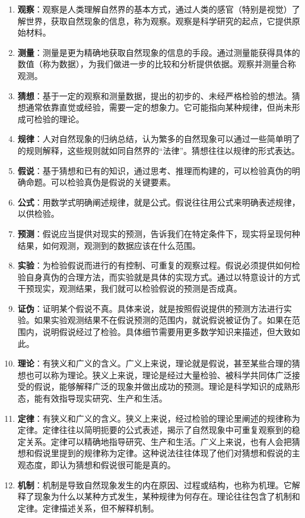 \documentclass[12pt,UTF8,fontset=none]{ctexbook}
\begin{document}
\begin{enumerate}[label=\textbf{\arabic*.}]
    \item \textbf{观察}：观察是人类理解自然界的基本方式，通过人类的感官（特别是视觉）了解世界，获取自然现象的信息，称为观察。观察是科学研究的起点，它提供原始材料。
    \item \textbf{测量}：测量是更为精确地获取自然现象的信息的手段。通过测量能获得具体的数值（称为数据），为我们做进一步的比较和分析提供依据。观察并测量合称观测。
    \item \textbf{猜想}：基于一定的观察和测量数据，提出的初步的、未经严格检验的想法。猜想通常依靠直觉或经验，需要一定的想象力。它可能指向某种规律，但尚未形成可检验的理论。
    \item \textbf{规律}：人对自然现象的归纳总结，认为繁多的自然现象可以通过一些简单明了的规则解释，这些规则就如同自然界的“法律”。猜想往往以规律的形式表达。
    \item \textbf{假说}：基于猜想和已有的知识，通过思考、推理而构建的，可以检验真伪的明确命题。可以检验真伪是假说的关键要素。
    \item \textbf{公式}：用数学式明确阐述规律，就是公式。假说往往用公式来明确表述规律，以供检验。
    \item \textbf{预测}：假说应当提供对现实的预测，告诉我们在特定条件下，现实将呈现何种结果，如何观测，观测到的数据应该在什么范围。
    \item \textbf{实验}：为检验假说而进行的有控制、可重复的观察过程。假说必须提供如何检验自身真伪的合理方法，而实验就是具体的实现方式。通过以特意设计的方式干预现实，观测结果，我们就可以检验假说的预测是否成真。
    \item \textbf{证伪}：证明某个假说不真。具体来说，就是按照假说提供的预测方法进行实验。如果实验观测结果不在假说预测的范围内，就说假说被证伪了。如果在范围内，说明假说经过了检验。具体细节需要用更多数学知识来描述，但大致如此。
    \item \textbf{理论}：有狭义和广义的含义。广义上来说，理论就是假说，甚至某些合理的猜想也可以称为理论。狭义上来说，理论是经过大量检验、被科学共同体广泛接受的假说，能够解释广泛的现象并做出成功的预测。理论是科学知识的成熟形态，能有效指导现实研究、生产和生活。
    \item \textbf{定律}：有狭义和广义的含义。狭义上来说，经过检验的理论里阐述的规律称为定律。定律往往以简明扼要的公式表述，揭示了自然现象中可重复观察到的稳定关系。定律可以精确地指导研究、生产和生活。广义上来说，也有人会把猜想和假说里提到的规律称为定律。这种说法往往体现了他们对猜想和假说的主观态度，即认为猜想和假说很可能是真的。
    \item \textbf{机制}：机制是导致自然现象发生的内在原因、过程或结构，也称为机理。它解释了现象为什么以某种方式发生，某种规律为何存在。理论往往包含了机制和定律。定律描述关系，但不解释机制。
\end{enumerate}
\end{document}
